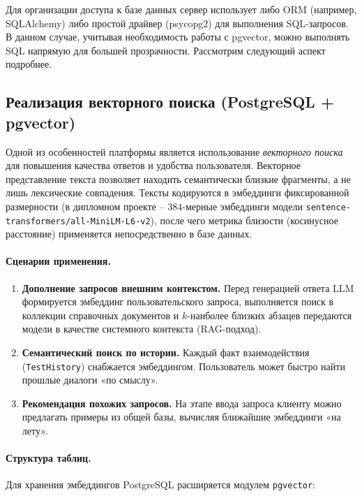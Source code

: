 Для организации доступа к базе данных сервер использует либо ORM (например, SQLAlchemy) либо простой драйвер (psycopg2) для выполнения SQL-запросов. В данном случае, учитывая необходимость работы с pgvector, можно выполнять SQL напрямую для большей прозрачности. Рассмотрим следующий аспект подробнее.

\subsection{Реализация векторного поиска (PostgreSQL + pgvector)}

Одной из особенностей платформы является использование \emph{векторного поиска}
для повышения качества ответов и удобства пользователя.
Векторное представление текста позволяет находить семантически близкие фрагменты,
а не лишь лексические совпадения.  
Тексты кодируются в эмбеддинги фиксированной размерности
(в дипломном проекте – $384$-мерные эмбеддинги  
модели \verb|sentence-transformers/all-MiniLM-L6-v2|),
после чего метрика близости (косинусное расстояние) применяется непосредственно в базе данных\cite{wiki:cosine_similarity}.

\paragraph{Сценарии применения.}
\begin{enumerate}[label=\arabic*]
  \item \textbf{Дополнение запросов внешним контекстом.}  
        Перед генерацией ответа LLM формируется эмбеддинг пользовательского запроса,
        выполняется поиск в коллекции справочных документов
        и $k$-наиболее близких абзацев передаются модели в качестве
        системного контекста (RAG-подход).
  \item \textbf{Семантический поиск по истории.}  
        Каждый факт взаимодействия (\texttt{TestHistory}) снабжается эмбеддингом.
        Пользователь может быстро найти прошлые диалоги «по смыслу».
  \item \textbf{Рекомендация похожих запросов.}  
        На этапе ввода запроса клиенту можно предлагать примеры из общей базы, вычисляя ближайшие эмбеддинги «на лету»\cite{flowgpt:community}.
\end{enumerate}

\paragraph{Структура таблиц.}
Для хранения эмбеддингов PostgreSQL расширяется модулем \texttt{pgvector}:

